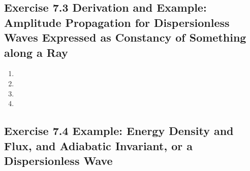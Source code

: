 \documentclass[../main.tex]{subfiles}
\begin{document}
\subsection{Exercise 7.3 Derivation and Example: Amplitude Propagation for Dispersionless Waves Expressed as Constancy of Something along a Ray}
\begin{enumerate}[label=(\alph*)]
\item
\item
\item
\item
\end{enumerate}

\subsection{Exercise 7.4 Example: Energy Density and Flux, and Adiabatic Invariant, or a Dispersionless Wave}
\end{document}
